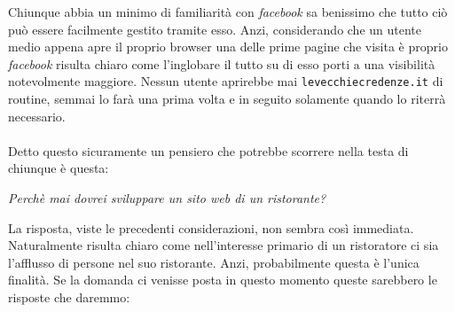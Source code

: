 Chiunque abbia un minimo di familiarità con \textit{facebook} sa benissimo che tutto ciò può essere facilmente gestito tramite esso. Anzi, considerando che un utente medio appena apre il proprio browser una delle prime pagine che visita è proprio \textit{facebook} risulta chiaro come l'inglobare il tutto su di esso porti a una visibilità notevolmente maggiore. Nessun utente aprirebbe mai \texttt{levecchiecredenze.it} di routine, semmai lo farà una prima volta e in seguito solamente quando lo riterrà necessario. \\ \\
Detto questo sicuramente un pensiero che potrebbe scorrere nella testa di chiunque è questa:

\begin{center}

\textit{Perchè mai dovrei sviluppare un sito web di un ristorante?}

\end{center}
La risposta, viste le precedenti considerazioni, non sembra così immediata. Naturalmente risulta chiaro come nell'interesse primario di un ristoratore ci sia l'afflusso di persone nel suo ristorante. Anzi, probabilmente questa è l'unica finalità. Se la domanda ci venisse posta in questo momento queste sarebbero le risposte che daremmo:

